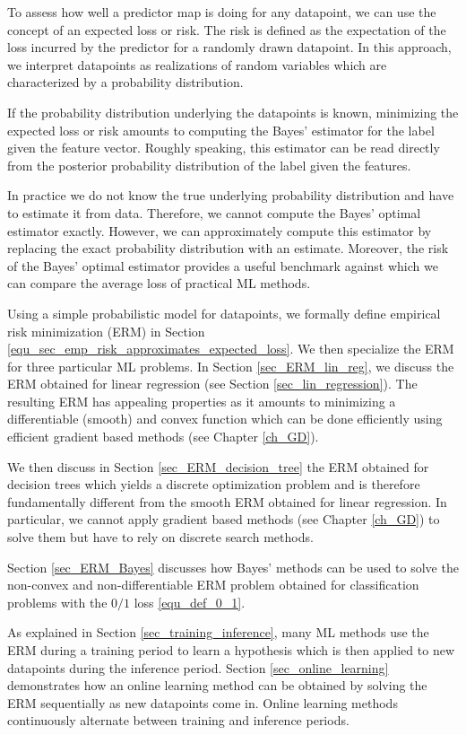 \documentclass[12pt]{report}
\begin{document}
To assess how well a predictor map is doing for any datapoint, 
we can use the concept of an expected loss or risk. The risk is 
defined as the expectation of the loss incurred by the predictor 
for a randomly drawn datapoint. In this approach, we interpret 
datapoints as realizations of random variables which are 
characterized by a probability distribution. 

If the probability distribution underlying the datapoints is known, 
minimizing the expected loss or risk amounts to computing the 
Bayes' estimator for the label given the feature vector. 
Roughly speaking, this estimator can be read directly from the 
posterior probability distribution of the label given the features. 

In practice we do not know the true underlying probability 
distribution and have to estimate it from data. Therefore, 
we cannot compute the Bayes' optimal estimator exactly. 
However, we can approximately compute this estimator 
by replacing the exact probability distribution with an 
estimate. Moreover, the risk of the Bayes' optimal estimator 
provides a useful benchmark against which we can compare 
the average loss of practical ML methods. 

Using a simple probabilistic model for datapoints, we formally define 
empirical risk minimization (ERM) in Section \eqref{equ_sec_emp_risk_approximates_expected_loss}. 
We then specialize the ERM for three particular ML problems. In Section \ref{sec_ERM_lin_reg}, 
we discuss the ERM obtained for linear regression (see Section \ref{sec_lin_regression}). 
The resulting ERM has appealing properties as it amounts to 
minimizing a differentiable (smooth) and convex function which 
can be done efficiently using efficient gradient based methods (see Chapter \ref{ch_GD}). 

We then discuss in Section \ref{sec_ERM_decision_tree} the ERM 
obtained for decision trees which yields a discrete optimization 
problem and is therefore fundamentally different from the smooth 
ERM obtained for linear regression. In particular, we cannot apply 
gradient based methods (see Chapter \ref{ch_GD}) to solve them 
but have to rely on discrete search methods. 

Section \ref{sec_ERM_Bayes} discusses how Bayes' methods 
can be used to solve the non-convex and non-differentiable 
ERM problem obtained for classification problems with the 
$0/1$ loss \eqref{equ_def_0_1}. 

As explained in Section \ref{sec_training_inference}, many ML methods 
use the ERM during a training period to learn a hypothesis which is 
then applied to new datapoints during the inference period. 
Section \ref{sec_online_learning} demonstrates how an online 
learning method can be obtained by solving the ERM sequentially 
as new datapoints come in. Online learning methods continuously 
alternate between training and inference periods. 
\end{document}
